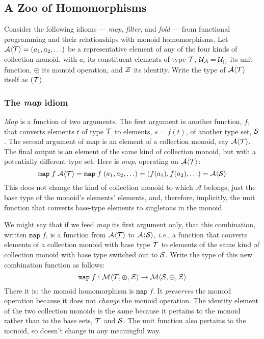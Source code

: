 \subsection{\color{red}A Zoo of Homomorphisms}


Consider the following idioms --- \emph{map}, \emph{filter}, and \emph{fold} --- from functional programming and their relationships with monoid homomorphisms. Let $\mathcal{A}\langle\mathcal{T}\rangle=(a_1,a_2,\ldots)$ be a representative element of any of the four kinds of collection monoid, with $a_{i}$ its constituent elements of type $\mathcal{T}$, $\mathcal{U}_{\mathcal{A}}=\mathcal{U}_{\mathcal{()}}$ its unit function, $\oplus$ its monoid operation, and $\mathcal{Z}$ its identity. Write the type of $\mathcal{A}\langle\mathcal{T}\rangle$ itself as $(\mathcal{T})$.


\subsubsection{\color{red}The \emph{map} idiom}


\emph{Map} is a function of two arguments. The first argument is another function, $f$, that converts elements $t$ of type $\mathcal{T}$ to elements, $s=f(t)$, of another type set, $\mathcal{S}$. The second argument of map is an element of a collection monoid, say $\mathcal{A}\langle\mathcal{T}\rangle$. The final output is an element of the same kind of collection monoid, but with a potentially different type set. Here is \emph{map}, operating on $\mathcal{A}\langle\mathcal{T}\rangle$:
\[
  \mathtt{map}\;f\;\mathcal{A}\langle\mathcal{T}\rangle=
  \mathtt{map}\;f\;(a_1,a_2,\ldots) =
  \left( f(a_1),f(a_2),\ldots\right) = \mathcal{A}\langle\mathcal{S}\rangle
\]
This does not change the kind of collection monoid to which $\mathcal{A}$ belongs, just the base type of the monoid's elements' elements, and, therefore, implicitly, the unit function that converts base-type elements to singletons in the monoid.

We might say that if we feed \emph{map} its first argument only, that this combination, written $\mathtt{map}\;f$, is a function from $\mathcal{A}\langle\mathcal{T}\rangle$ to $\mathcal{A}\langle\mathcal{S}\rangle$, \emph{i.e.}, a function that converts elements of a collection monoid with base type $\mathcal{T}$ to elements of the same kind of collection monoid with base type switched out to $\mathcal{S}$. Write the type of this new combination function as follows:
\[
  \mathtt{map}\;f:\mathcal{M}\langle{\mathcal{T}},{\oplus},{\mathcal{Z}}\rangle
    \rightarrow\mathcal{M}\langle{\mathcal{S}},{\oplus},{\mathcal{Z}}\rangle
\]
There it is: the monoid homomorphism is $\mathtt{map}\;f$. It \emph{preserves} the monoid operation because it does not \emph{change} the monoid operation. The identity element of the two collection monoids is the same because it pertains to the monoid rather than to the base sets, $\mathcal{T}$ and $\mathcal{S}$. The unit function also pertains to the monoid, so doesn't change in any meaningful way.

